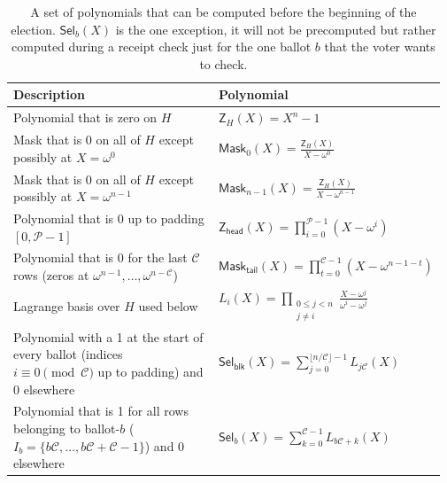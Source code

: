 \begin{table}[t]
\small
\setlength{\tabcolsep}{5pt}
\renewcommand{\arraystretch}{1.15}
\caption{A set of polynomials that can be computed before the beginning of the election. $\mathsf{Sel}_{b}(X)$ is the one exception, it will not be precomputed but rather computed during a receipt check just for the one ballot $b$ that the voter wants to check.}
\label{tab:selectors}
\begin{tabular}{@{}p{0.58\linewidth}|p{0.39\linewidth}@{}}
\toprule
\textbf{Description} & \textbf{Polynomial} \\
\midrule

Polynomial that is zero on $H$ &
$\mathsf{Z}_H(X)=X^n-1$ \\

Mask that is $0$ on all of $H$ except possibly at $X=\omega^0$ &
$\mathsf{Mask}_{0}(X)=\displaystyle\frac{\mathsf{Z}_H(X)}{X-\omega^0}$ \\

Mask that is $0$ on all of $H$ except possibly at $X=\omega^{n-1}$ &
$\mathsf{Mask}_{n-1}(X)=\displaystyle\frac{\mathsf{Z}_H(X)}{X-\omega^{n-1}}$ \\ \hline

Polynomial that is 0 up to padding $[0,\mathcal{P}-1]$ &
$\mathsf{Z}_{\mathsf{head}}(X)=\displaystyle\prod_{i=0}^{\mathcal{P}-1}\left(X-\omega^i\right)$ \\

Polynomial that is 0 for the last $\mathcal{C}$ rows (zeros at $\omega^{n-1},\dots,\omega^{n-\mathcal{C}}$) &
$\mathsf{Mask}_{\mathsf{tail}}(X)=\displaystyle\prod_{t=0}^{\mathcal{C}-1}\left(X-\omega^{n-1-t}\right)$ \\ \hline

Lagrange basis over $H$ used below &
$L_i(X)=\displaystyle\prod_{\substack{0\le j<n\\ j\ne i}}\frac{X-\omega^j}{\omega^i-\omega^j}$ \\

Polynomial with a 1 at the start of every ballot (indices $i\equiv 0\!\!\pmod{\mathcal{C}}$ up to padding) and 0 elsewhere&
$\mathsf{Sel}_{\mathsf{blk}}(X)=\displaystyle\sum_{j=0}^{\lfloor n/\mathcal{C}\rfloor-1} L_{j\mathcal{C}}(X)$ \\

Polynomial that is 1 for all rows belonging to ballot-$b$ ($I_b=\{b\mathcal{C},\dots,b\mathcal{C}+\mathcal{C}-1\}$) and 0 elsewhere &
$\mathsf{Sel}_{b}(X)=\displaystyle\sum_{k=0}^{\mathcal{C}-1} L_{b\mathcal{C}+k}(X)$ \\

\bottomrule
\end{tabular}
\end{table}
